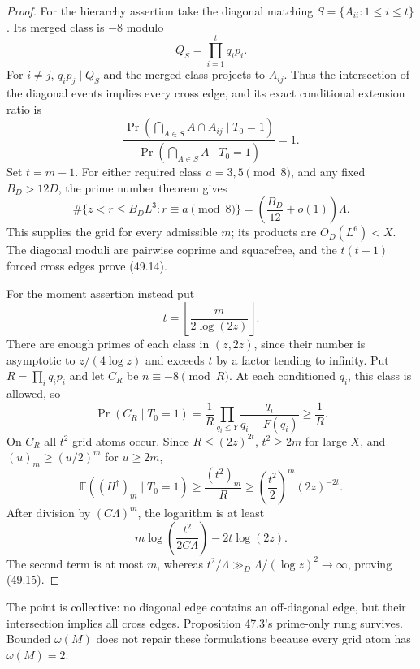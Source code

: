\documentclass[10pt,reqno]{amsart}
\theoremstyle{definition}
\newcommand{\1}{\mathbf 1}
\begin{document}
\begin{proof}
For the hierarchy assertion take the diagonal matching
$S=\{A_{ii}:1\leq i\leq t\}$.  Its merged class is $-8$ modulo
\begin{equation}\tag{49.16}
                         Q_S=\prod_{i=1}^tq_ip_i.
\end{equation}
For $i\ne j$, $q_ip_j\mid Q_S$ and the merged class projects to $A_{ij}$.
Thus the intersection of the diagonal events implies every cross edge, and
its exact conditional extension ratio is
\begin{equation}\tag{49.17}
 \frac{\Pr(\bigcap_{A\in S}A\cap A_{ij}\mid T_0=1)}
      {\Pr(\bigcap_{A\in S}A\mid T_0=1)}=1.
\end{equation}
Set $t=m-1$.  For either required class $a=3,5\pmod8$, and any fixed
$B_D>12D$, the prime number theorem gives
\[
 \#\{z<r\leq B_DL^3:r\equiv a\pmod8\}
 =\left(\frac{B_D}{12}+o(1)\right)\Lambda.
\]
This supplies the grid for every admissible $m$; its products are
$O_D(L^6)<X$.  The diagonal moduli are pairwise coprime and squarefree, and
the $t(t-1)$ forced cross edges prove (49.14).

For the moment assertion instead put
\begin{equation}\tag{49.18}
 t=\left\lfloor\frac m{2\log(2z)}\right\rfloor.
\end{equation}
There are enough primes of each class in $(z,2z)$, since their number is
asymptotic to $z/(4\log z)$ and exceeds $t$ by a factor tending to infinity.
Put $R=\prod_iq_ip_i$ and let $C_R$ be $n\equiv-8\pmod R$.  At each
conditioned $q_i$, this class is allowed, so
\begin{equation}\tag{49.19}
 \Pr(C_R\mid T_0=1)=\frac1R
 \prod_{q_i\leq Y}\frac{q_i}{q_i-F(q_i)}\geq\frac1R.
\end{equation}
On $C_R$ all $t^2$ grid atoms occur.  Since $R\leq(2z)^{2t}$,
$t^2\geq2m$ for large $X$, and $(u)_m\geq(u/2)^m$ for $u\geq2m$,
\begin{equation}\tag{49.20}
 \mathbb E((H^\dagger)_m\mid T_0=1)
 \geq\frac{(t^2)_m}{R}
 \geq\left(\frac{t^2}{2}\right)^m(2z)^{-2t}.
\end{equation}
After division by $(C\Lambda)^m$, the logarithm is at least
\begin{equation}\tag{49.21}
 m\log\left(\frac{t^2}{2C\Lambda}\right)-2t\log(2z).
\end{equation}
The second term is at most $m$, whereas
$t^2/\Lambda\gg_D\Lambda/(\log z)^2\to\infty$, proving (49.15).
\end{proof}
The point is collective: no diagonal edge contains an off-diagonal edge,
but their intersection implies all cross edges.  Proposition 47.3's
prime-only rung survives.  Bounded $\omega(M)$ does not repair these
formulations because every grid atom has $\omega(M)=2$.
\end{document}
